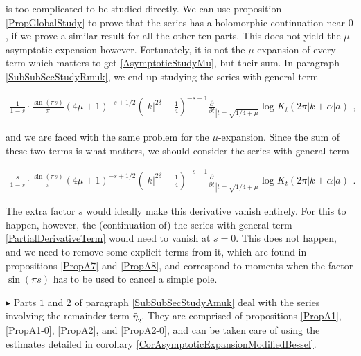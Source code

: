 \documentclass{jams-l}
\theoremstyle{definition}
\theoremstyle{remark}
\numberwithin{equation}{section}
\begin{document}
                    \noindent is too complicated to be studied directly. We can use proposition \ref{PropGlobalStudy} to prove that the series has a holomorphic continuation near $0$, if we prove a similar result for all the other ten parts. This does not yield the $\mu$-asymptotic expension however. Fortunately, it is not the $\mu$-expansion of every term which matters to get \eqref{AsymptoticStudyMu}, but their sum. In paragraph \ref{SubSubSecStudyRmuk}, we end up studying the series with general term
                    
                    \[ \begin{array}{c}
                            \frac{1}{1-s} \cdot \frac{\sin \left( \pi s \right)}{\pi} \left( 4 \mu+1 \right)^{-s+1/2} \left( \left \vert k \right \vert^{2 \delta} - \frac{1}{4} \right)^{-s+1} \frac{\partial}{\partial t}_{\left \vert t = \sqrt{1/4 + \mu} \right.} \log K_t \left( 2 \pi \left \vert k + \alpha \right \vert a \right)
                        \end{array} , \]
                    
                    \noindent and we are faced with the same problem for the $\mu$-expansion. Since the sum of these two terms is what matters, we should consider the series with general term
                    
                    \[ \begin{array}{c}
                            \frac{s}{1-s} \cdot \frac{\sin \left( \pi s \right)}{\pi} \left( 4 \mu+1 \right)^{-s+1/2} \left( \left \vert k \right \vert^{2 \delta} - \frac{1}{4} \right)^{-s+1} \frac{\partial}{\partial t}_{\left \vert t = \sqrt{1/4 + \mu} \right.} \log K_t \left( 2 \pi \left \vert k + \alpha \right \vert a \right)
                        \end{array} . \]
                    
                    \noindent The extra factor $s$ would ideally make this derivative vanish entirely. For this to happen, however, the (continuation of) the series with general term \eqref{PartialDerivativeTerm} would need to vanish at $s=0$. This does not happen, and we need to remove some explicit terms from it, which are found in propositions \ref{PropA7} and \ref{PropA8}, and correspond to moments when the factor $\sin \left( \pi s \right)$ has to be used to cancel a simple pole.
                    
                
                \medskip
                    
                \hspace{30pt} $\blacktriangleright$ Parts $1$ and $2$ of paragraph \ref{SubSubSecStudyAmuk} deal with the series involving the remainder term $\widetilde{\eta_2}$. They are comprised of propositions \ref{PropA1}, \ref{PropA1-0}, \ref{PropA2}, and \ref{PropA2-0}, and can be taken care of using the estimates detailed in corollary \ref{CorAsymptoticExpansionModifiedBessel}.
                
\end{document}
